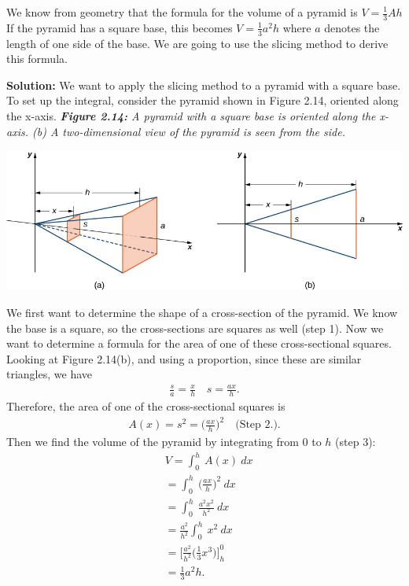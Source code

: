 \documentclass{report}
\begin{document}
    \begin{eg}
        We know from geometry that the formula for the volume of a pyramid is  $V = \frac{1}{3}Ah$ 
        If the pyramid has a square base, this becomes  $V=\frac{1}{3}a^{2}h $ where $a$ 
        denotes the length of one side of the base. We are going to use the slicing method to derive this formula.
    \end{eg}
    \bigbreak \noindent 
    \textbf{Solution:}
    \bigbreak \noindent 
    We want to apply the slicing method to a pyramid with a square base. To set up the integral, consider the pyramid shown in Figure 2.14, oriented along the  x-axis.
    \bigbreak \noindent 
    \textit{\textbf{Figure 2.14:} A pyramid with a square base is oriented along the x-axis. (b) A two-dimensional view of the pyramid is seen from the side.}
    \begin{center}
        \includegraphics[scale=0.5]{./figures/graph11.png}
    \end{center}
    \bigbreak \noindent 
    We first want to determine the shape of a cross-section of the pyramid. We know the base is a square, so the cross-sections are squares as well (step 1). Now we want to determine a formula for the area of one of these cross-sectional squares. Looking at Figure 2.14(b), and using a proportion, since these are similar triangles, we have
    \begin{align*}
        \frac{s}{a} = \frac{x}{h} \quad s = \frac{ax}{h}
    .\end{align*}
    \bigbreak \noindent 
    Therefore, the area of one of the cross-sectional squares is
    \begin{align*}
        A(x) = s^{2} = \bigg(\frac{ax}{h}\bigg)^{2} \quad \text{(Step 2.)}
    .\end{align*}
    \bigbreak \noindent 
    Then we find the volume of the pyramid by integrating from  0 to $h$ (step  3):
    \begin{align*}
        &V = \int_{0}^{h}\ A(x)\ dx \\
        &=\int_{0}^{h}\ \bigg(\frac{ax}{h}\bigg)^{2}\ dx \\
        &=\int_{0}^{h}\ \frac{a^{2}x^{2}}{h^{2}}\ dx\\
        &=\frac{a^{2}}{h^{2}}\int_{0}^{h}\ x^{2}\ dx \\
        &=\bigg[\frac{a^{2}}{h^{2}}\bigg(\frac{1}{3}x^{3}\bigg)\bigg]^{0}_{h} \\
        &=\frac{1}{3}a^{2}h
    .\end{align*}
\end{document}
